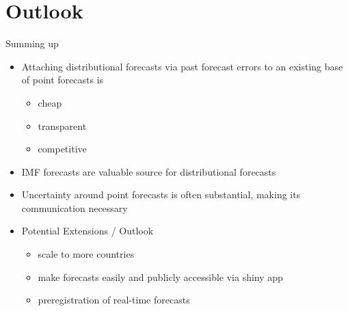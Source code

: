 \documentclass[en]{sdqbeamer}
\begin{document}
\section{Outlook}

\begin{frame}{Summing up}
\begin{itemize}
\item Attaching distributional forecasts via past forecast errors to an existing base of point forecasts is
    \begin{itemize}
        \item cheap
        \item transparent
        \item competitive
    \end{itemize}
\item IMF forecasts are valuable source for distributional forecasts 
\item Uncertainty around point forecasts is often substantial, making its communication necessary\bigskip \\
\item Potential Extensions / Outlook
    \begin{itemize}
        \item scale to more countries
        \item make forecasts easily and publicly accessible via shiny app
        \item preregistration of real-time forecasts
    \end{itemize}

\end{itemize}
\end{frame}
\end{document}
